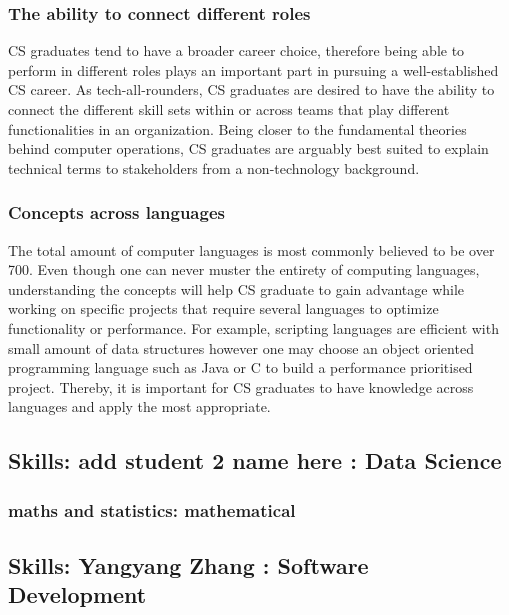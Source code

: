 \documentclass[a4paper, 11pt]{report}
\begin{document}
\subsubsection{The ability to connect different roles}
CS graduates tend to have a broader career choice, therefore being able to perform in different roles plays an important part in pursuing a well-established CS career. As tech-all-rounders, CS graduates are desired to have the ability to connect the different skill sets within or across teams that play different functionalities in an organization. Being closer to the fundamental theories behind computer operations, CS graduates are arguably best suited to explain technical terms to stakeholders from a non-technology background.
\subsubsection{Concepts across languages}
The total amount of computer languages is most commonly believed to be over 700. Even though one can never muster the entirety of computing languages, understanding the concepts will help CS graduate to gain advantage while working on specific projects that require several languages to optimize functionality or performance. For example, scripting languages are efficient with small amount of data structures however one may choose an object oriented programming language such as Java or C to build a performance prioritised project. Thereby, it is important for CS graduates to have knowledge across languages and apply the most appropriate.

\subsection{Skills: add student 2 name here : Data Science}

\subsubsection{maths and statistics: mathematical}




\subsection{Skills: Yangyang Zhang : Software Development}
\end{document}
